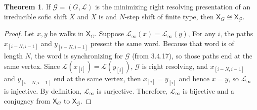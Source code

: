 \documentclass{article}
\newcommand{\Lc}{\mathcal{L}}  %
\newcommand{\Gc}{\mathcal{G}}  %
\newcommand{\Vc}{\mathcal{V}}
\newcommand{\Ec}{\mathcal{E}}
\newcommand{\shift}[1]{\mathsf{X}_{#1}}
\newcommand{\term}[1]{\textit{#1}}
\theoremstyle{definition}
\newtheorem{theorem}{Theorem}
\newtheorem{definition}{Definition}
\begin{document}
    \begin{theorem}
        If \(\mathcal{G} = (G, \mathcal{L})\) is the minimizing right resolving
        presentation of an irreducible sofic shift \(X\) and \(X\) is and
        \(N\)-step shift of finite type, then \(\shift{G} \cong \shift{\Gc}\).
    \end{theorem}
    
    \begin{proof}
        Let \(x, y\) be walks in \(\shift{G}\). Suppose \(\mathcal{L}_\infty(x)=\mathcal{L}_\infty(y)\),
        For any \(i\), the paths \(x_{[i-N, i-1]}\) and \(y_{[i-N, i-1]}\) present 
        the same word. Because that word is of length \(N\), the word is synchronizing
        for \(\mathcal{G}\) (from 3.4.17), so those paths end at the same vertex. Since
        \(\mathcal{L}(x_{[i]}) = \mathcal{L}(y_{[i]})\), \(\mathcal{G}\) is right 
        resolving, and \(x_{[i-N, i-1]}\) and \(y_{[i-N, i-1]}\) end at the same vertex,
        then \(x_{[i]} = y_{[i]}\) and hence \(x = y\), so \(\mathcal{L}_\infty\) is injective.
        By definition, \(\mathcal{L}_\infty\) is surjective. Therefore, \(\mathcal{L}_\infty\) is bijective and 
        a conjugacy from \(\mathsf{X}_G\) to \(\mathsf{X}_\mathcal{G}\).
    \end{proof}





\end{document}
